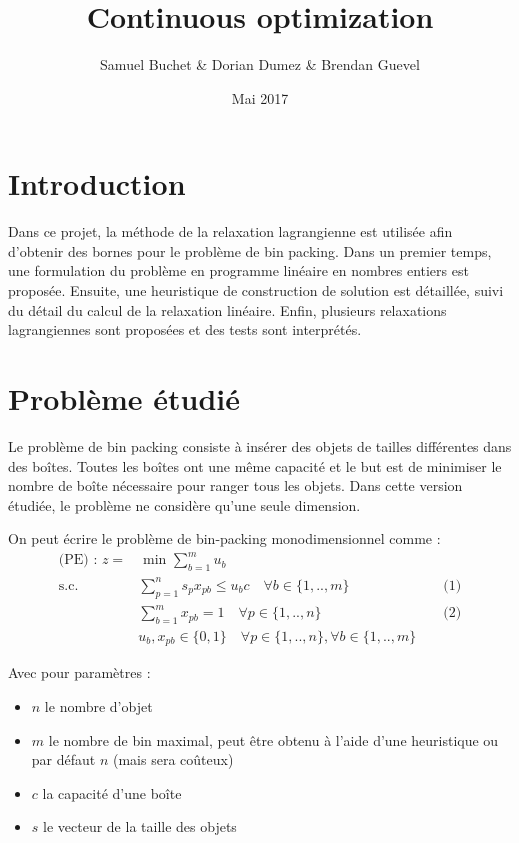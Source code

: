 \documentclass{article}
\title{Continuous optimization}
\author{Samuel Buchet \& Dorian Dumez \& Brendan Guevel}
\date{Mai 2017}
\begin{document}
\maketitle

\section{Introduction}

Dans ce projet, la méthode de la relaxation lagrangienne est utilisée afin d'obtenir des bornes pour le problème de bin packing.
Dans un premier temps, une formulation du problème en programme linéaire en nombres entiers est proposée.
Ensuite, une heuristique de construction de solution est détaillée, suivi du détail du calcul de la relaxation linéaire.
Enfin, plusieurs relaxations lagrangiennes sont proposées et des tests sont interprétés.

\section{Problème étudié}

Le problème de bin packing consiste à insérer des objets de tailles différentes dans des boîtes.
Toutes les boîtes ont une même capacité et le but est de minimiser le nombre de boîte nécessaire pour ranger tous les objets.
Dans cette version étudiée, le problème ne considère qu'une seule dimension.\newline

On peut écrire le problème de bin-packing monodimensionnel comme :\\

\begin{align*}
    \text{(PE) : } z = &\text{ min } \sum \limits_{b = 1 }^{m} u_b \\
    \text{s.c.  } &\sum \limits_{p = 1}^{n} s_p x_{pb} \leqslant u_b c \quad \forall b \in \{1, .., m\} &&\text{ (1)}\\
    &\sum \limits_{b = 1}^{m} x_{pb} = 1 \quad \forall p \in \{1, .., n\} &&\text{ (2)} \\
    &u_b , x_{pb} \in \{0,1\} \quad \forall p \in \{ 1, .., n\}, \forall b \in \{1, .., m\}
\end{align*}

Avec pour paramètres :
\begin{itemize}
    \item $n$ le nombre d'objet
    \item $m$ le nombre de bin maximal, peut être obtenu à l'aide d'une heuristique ou par défaut $n$ (mais sera coûteux)
    \item $c$ la capacité d'une boîte
    \item $s$ le vecteur de la taille des objets
\end{itemize}
\end{document}
